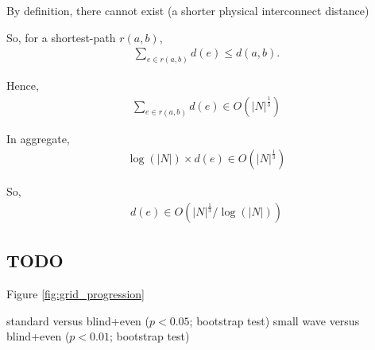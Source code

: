 By definition, there cannot exist
(a shorter physical interconnect distance)

So, for a shortest-path $r(a,b)$,
\begin{align*}
\sum_{e \in r(a,b)} d(e) \leq d(a,b).
\end{align*}

Hence,
\begin{align*}
\sum_{e \in r(a,b)} d(e) \in O(|N|^{\frac{1}{3}})
\end{align*}

In aggregate,
\begin{align*}
\log(|N|) \times d(e) \in O(|N|^{\frac{1}{3}})
\end{align*}

So,
\begin{align*}
d(e) \in O(|N|^{\frac{1}{3}} / \log(|N|))
\end{align*}




\subsection{TODO}

Figure \ref{fig:grid_progression}

standard versus blind+even ($p < 0.05$; bootstrap test)
small wave versus blind+even ($p < 0.01$; bootstrap test)
